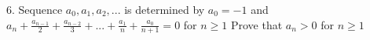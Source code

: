 6. Sequence $a_{0}, a_{1}, a_{2},...$ is determined by $a_{0}=-1$ and
$a_{n}+\frac{a_{n-1}}{2}+\frac{a_{n-2}}{3}+...+\frac{a_{1}}{n}+\frac{a_{0}}{n+1}=0$ for $n\geq 1$
Prove that $a_{n}>0$ for $n\geq 1$